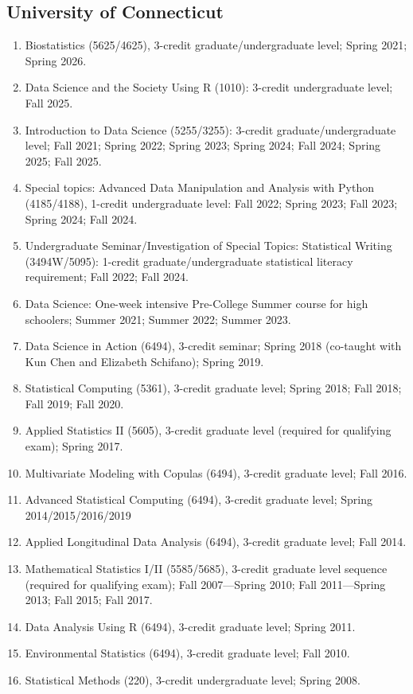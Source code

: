 \documentclass[Statistics]{vita}
\begin{document}
\begin{vita}
    \subsection{University of Connecticut}
    \begin{enumerate}
    \item Biostatistics (5625/4625), 3-credit graduate/undergraduate level; Spring 2021; Spring 2026.
    \item Data Science and the Society Using R (1010): 3-credit undergraduate level; Fall 2025.
    \item Introduction to Data Science (5255/3255): 3-credit graduate/undergraduate level; Fall 2021; Spring 2022; Spring 2023; Spring 2024; Fall 2024; Spring 2025; Fall 2025.
    \item Special topics: Advanced Data Manipulation and Analysis with Python (4185/4188), 1-credit undergraduate level: Fall 2022; Spring 2023; Fall 2023; Spring 2024; Fall 2024.
    \item Undergraduate Seminar/Investigation of Special Topics: Statistical Writing (3494W/5095): 1-credit graduate/undergraduate statistical literacy requirement; Fall 2022; Fall 2024.
    \item Data Science: One-week intensive Pre-College Summer course for high schoolers; Summer 2021; Summer 2022; Summer 2023.
    \item Data Science in Action (6494), 3-credit seminar; Spring 2018 (co-taught with Kun Chen and Elizabeth Schifano); Spring 2019.
    \item Statistical Computing (5361), 3-credit graduate level; Spring 2018; Fall 2018; Fall 2019; Fall 2020.
    \item Applied Statistics II (5605), 3-credit graduate level (required for qualifying exam); Spring 2017.
    \item Multivariate Modeling with Copulas (6494), 3-credit graduate level; Fall 2016.
    \item Advanced Statistical Computing (6494), 3-credit graduate level; Spring 2014/2015/2016/2019
    \item Applied Longitudinal Data Analysis (6494), 3-credit graduate level; Fall 2014.
    \item Mathematical Statistics I/II (5585/5685), 3-credit graduate level sequence (required for qualifying exam); Fall 2007---Spring 2010; Fall 2011---Spring 2013; Fall 2015; Fall 2017.
    \item Data Analysis Using R (6494), 3-credit graduate level; Spring 2011.
    \item Environmental Statistics (6494), 3-credit graduate level; Fall 2010.
    \item Statistical Methods (220), 3-credit undergraduate level; Spring 2008.
    \end{enumerate}

\end{vita}
\end{document}
